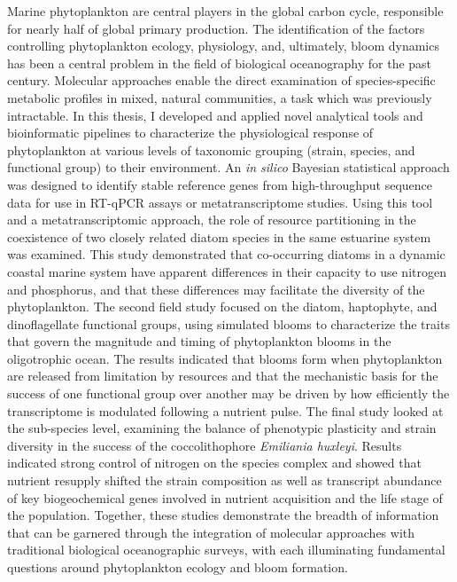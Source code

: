 Marine phytoplankton are central players in the global carbon cycle, responsible for nearly half of global primary production. The identification of the factors controlling phytoplankton ecology, physiology, and, ultimately, bloom dynamics has been a central problem in the field of biological oceanography for the past century. Molecular approaches enable the direct examination of species-specific metabolic profiles in mixed, natural communities, a task which was previously intractable. In this thesis, I developed and applied novel analytical tools and bioinformatic pipelines to characterize the physiological response of phytoplankton at various levels of taxonomic grouping (strain, species, and functional group) to their environment. An \textit{in silico} Bayesian statistical approach was designed to identify stable reference genes from high-throughput sequence data for use in RT-qPCR assays or metatranscriptome studies. Using this tool and a metatranscriptomic approach, the role of resource partitioning in the coexistence of two closely related diatom species in the same estuarine system was examined. This study demonstrated that co-occurring diatoms in a dynamic coastal marine system have apparent differences in their capacity to use nitrogen and phosphorus, and that these differences may facilitate the diversity of the phytoplankton. The second field study focused on the diatom, haptophyte, and dinoflagellate functional groups, using simulated blooms to characterize the traits that govern the magnitude and timing of phytoplankton blooms in the oligotrophic ocean. The results indicated that blooms form when phytoplankton are released from limitation by resources and that the mechanistic basis for the success of one functional group over another may be driven by how efficiently the transcriptome is modulated following a nutrient pulse. The final study looked at the sub-species level, examining the balance of phenotypic plasticity and strain diversity in the success of the coccolithophore \textit{Emiliania huxleyi}. Results indicated strong control of nitrogen on the species complex and showed that nutrient resupply shifted the strain composition as well as transcript abundance of key biogeochemical genes involved in nutrient acquisition and the life stage of the population. Together, these studies demonstrate the breadth of information that can be garnered through the integration of molecular approaches with traditional biological oceanographic surveys, with each illuminating fundamental questions around phytoplankton ecology and bloom formation.





